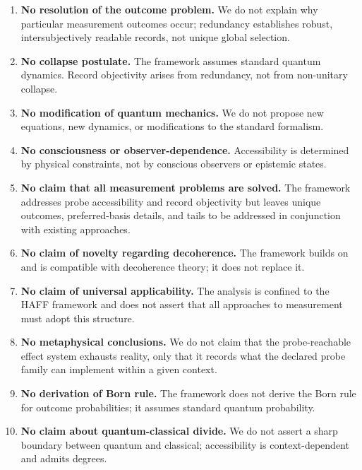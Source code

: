 \documentclass[12pt,a4paper,openany]{book}
\begin{document}
\begin{enumerate}
    \item \textbf{No resolution of the outcome problem.} We do not explain why particular measurement outcomes occur; redundancy establishes robust, intersubjectively readable records, not unique global selection.
    
    \item \textbf{No collapse postulate.} The framework assumes standard quantum dynamics. Record objectivity arises from redundancy, not from non-unitary collapse.
    
    \item \textbf{No modification of quantum mechanics.} We do not propose new equations, new dynamics, or modifications to the standard formalism.
    
    \item \textbf{No consciousness or observer-dependence.} Accessibility is determined by physical constraints, not by conscious observers or epistemic states.
    
    \item \textbf{No claim that all measurement problems are solved.} The framework addresses probe accessibility and record objectivity but leaves unique outcomes, preferred-basis details, and tails to be addressed in conjunction with existing approaches.
    
    \item \textbf{No claim of novelty regarding decoherence.} The framework builds on and is compatible with decoherence theory; it does not replace it.
    
    \item \textbf{No claim of universal applicability.} The analysis is confined to the HAFF framework and does not assert that all approaches to measurement must adopt this structure.
    
    \item \textbf{No metaphysical conclusions.} We do not claim that the probe-reachable effect system exhausts reality, only that it records what the declared probe family can implement within a given context.
    
    \item \textbf{No derivation of Born rule.} The framework does not derive the Born rule for outcome probabilities; it assumes standard quantum probability.
    
    \item \textbf{No claim about quantum-classical divide.} We do not assert a sharp boundary between quantum and classical; accessibility is context-dependent and admits degrees.
    

\end{enumerate}
\end{document}
